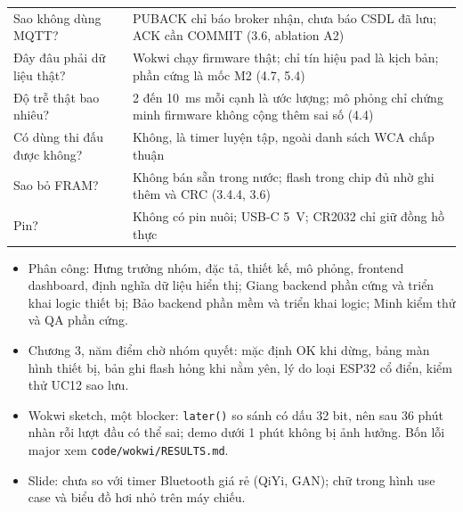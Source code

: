 \documentclass[a4paper,9pt]{extarticle}
\newcommand{\blk}[1]{\par\medskip{\color{hb}\large\bfseries #1}\par\smallskip}
\begin{document}
\blk{Câu hỏi khó, trả lời ở đâu}
\begin{tabular}{L{5.0cm} L{12.4cm}}
\toprule
Sao không dùng MQTT? & PUBACK chỉ báo broker nhận, chưa báo CSDL đã lưu; ACK cần COMMIT (3.6, ablation A2)\\
Đây đâu phải dữ liệu thật? & Wokwi chạy firmware thật; chỉ tín hiệu pad là kịch bản; phần cứng là mốc M2 (4.7, 5.4)\\
Độ trễ thật bao nhiêu? & 2 đến 10~ms mỗi cạnh là ước lượng; mô phỏng chỉ chứng minh firmware không cộng thêm sai số (4.4)\\
Có dùng thi đấu được không? & Không, là timer luyện tập, ngoài danh sách WCA chấp thuận\\
Sao bỏ FRAM? & Không bán sẵn trong nước; flash trong chip đủ nhờ ghi thêm và CRC (3.4.4, 3.6)\\
Pin? & Không có pin nuôi; USB-C 5~V; CR2032 chỉ giữ đồng hồ thực\\
\bottomrule
\end{tabular}

\blk{Còn mở}
\begin{itemize}
\item Phân công: Hưng trưởng nhóm, đặc tả, thiết kế, mô phỏng, frontend dashboard, định nghĩa dữ liệu hiển thị; Giang backend phần cứng và triển khai logic thiết bị; Bảo backend phần mềm và triển khai logic; Minh kiểm thử và QA phần cứng.
\item Chương 3, năm điểm chờ nhóm quyết: mặc định OK khi dừng, bảng màn hình thiết bị, bản ghi flash hỏng khi nằm yên, lý do loại ESP32 cổ điển, kiểm thử UC12 sao lưu.
\item Wokwi sketch, một blocker: \texttt{later()} so sánh có dấu 32 bit, nên sau 36 phút nhàn rỗi lượt đầu có thể sai; demo dưới 1 phút không bị ảnh hưởng. Bốn lỗi major xem \texttt{code/wokwi/RESULTS.md}.
\item Slide: chưa so với timer Bluetooth giá rẻ (QiYi, GAN); chữ trong hình use case và biểu đồ hơi nhỏ trên máy chiếu.
\end{itemize}
\end{document}
